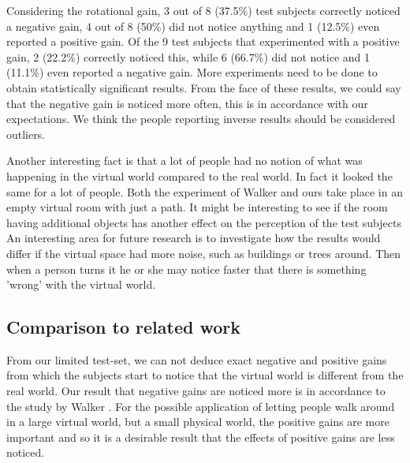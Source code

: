 Considering the rotational gain, 3 out of 8 (37.5\%) test subjects correctly noticed a negative gain, 4 out of 8 (50\%) did not notice anything and 1 (12.5\%) even reported a positive gain.
Of the 9 test subjects that experimented with a positive gain, 2 (22.2\%) correctly noticed this, while 6 (66.7\%) did not notice and 1 (11.1\%) even reported a negative gain.
More experiments need to be done to obtain statistically significant results.
From the face of these results, we could say that the negative gain is noticed more often, this is in accordance with our expectations.
We think the people reporting inverse results should be considered outliers.

Another interesting fact is that a lot of people had no notion of what was happening in the virtual world compared to the real world.
In fact it looked the same for a lot of people.
Both the experiment of Walker \cite{jwalker} and ours take place in an empty virtual room with just a path.
It might be interesting to see if the room having additional objects has another effect on the perception of the test subjects
An interesting area for future research is to investigate how the results would differ if the virtual space had more noise, such as buildings or trees around.
Then when a person turns it he or she may notice faster that there is something 'wrong'  with the virtual world.

\subsection{Comparison to related work}
From our limited test-set, we can not deduce exact negative and positive gains from which the subjects start to notice that the virtual world is different from the real world.
Our result that negative gains are noticed more is in accordance to the study by Walker \cite{jwalker}.
For the possible application of letting people walk around in a large virtual world, but a small physical world, the positive gains are more important and so it is a desirable result that the effects of positive gains are less noticed.
